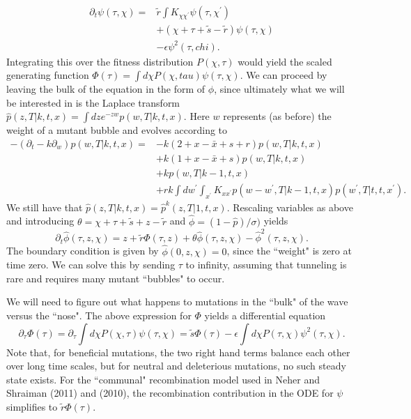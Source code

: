 \documentclass[10pt]{revtex4}
\begin{document}
\begin{align*}
\partial_t \psi(\tau,\chi) = &\tilde{r}\int K_{\chi \chi^\prime} \psi (\tau, \chi^\prime) \\
& + (\chi + \tau + \tilde{s} - \tilde{r}) \psi (\tau,\chi) \\
& - \epsilon \psi^2 (\tau,chi).
\end{align*}
Integrating this over the fitness distribution $P(\chi,\tau)$ would yield the scaled generating function $\Phi(\tau) = \int d\chi P(\chi,tau)\psi(\tau,\chi)$.
We can proceed by leaving the bulk of the equation in the form of $\phi$, since ultimately what we will be interested in is the Laplace transform $\hat{p} (z,T|k,t,x) = \int dz e^{-zw} p(w,T|k,t,x)$.
Here $w$ represents (as before) the weight of a mutant bubble and evolves according to
\begin{align*}
-(\partial_t -k\partial_w) p(w,T|k,t,x) = &-k(2+x-\bar{x}+s+r)p(w,T|k,t,x) \\
& + k(1+x-\bar{x}+s)p(w,T|k,t,x) \\
& +kp(w,T|k-1,t,x) \\
&+rk \int dw^\prime \int_{x^\prime} K_{x x^\prime} p(w-w^\prime , T|k-1, t, x) p(w^\prime,T|t,t,x^\prime).
\end{align*}
We still have that $\hat{p} (z,T|k,t,x) = \hat{p}^k (z,T|1,t,x)$.
Rescaling variables as above and introducing $\theta = \chi+\tau+\tilde{s}+z-\tilde{r}$ and $\hat{\phi} = (1-\hat{p})/\sigma)$ yields
\begin{equation}
\partial_t \hat{\phi}(\tau,z,\chi) = z + \tilde{r} \Phi(\tau, z) + \theta \hat{\phi}(\tau,z,\chi) - \hat{\phi}^2(\tau,z,\chi).
\end{equation}
The boundary condition is given by $\hat{\phi}(0,z,\chi) = 0$, since the ``weight" is zero at time zero.
We can solve this by sending $\tau$ to infinity, assuming that tunneling is rare and requires many mutant ``bubbles" to occur.

We will need to figure out what happens to mutations in the ``bulk" of the wave versus the ``nose".
The above expression for $\Phi$ yields a differential equation
\begin{equation}
\partial_\tau \Phi(\tau) = \partial_\tau \int d\chi P(\chi,\tau)\psi(\tau,\chi) = \tilde{s} \Phi(\tau) - \epsilon \int d\chi P(\tau,\chi) \psi^2 (\tau,\chi).
\end{equation}
Note that, for beneficial mutations, the two right hand terms balance each other over long time scales, but for neutral and deleterious mutations, no such steady state exists.
For the ``communal" recombination model used in Neher and Shraiman (2011) and (2010), the recombination contribution in the ODE for $\psi$ simplifies to $\tilde{r} \Phi(\tau)$.
\end{document}
